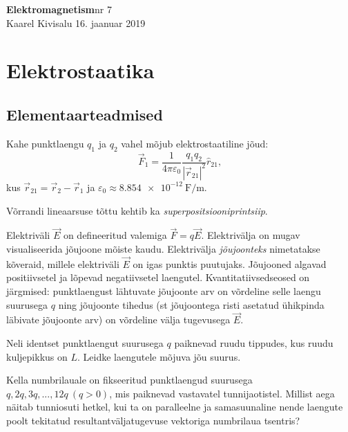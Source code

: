 \documentclass[a4paper,11pt,twocolumn]{article}
\begin{document}
{\huge \textbf{Elektromagnetism}\hfill \normalsize{nr 7}} \\
{Kaarel Kivisalu \hfill 16. jaanuar 2019}


\section{Elektrostaatika}
\subsection{Elementaarteadmised}
Kahe punktlaengu \( q_1 \) ja \( q_2 \) vahel mõjub elektrostaatiline jõud:
\begin{equation*}
    \vec{F}_{1} = \dfrac{1}{4\pi\varepsilon_0 }\dfrac{q_1 q_2}{|\vec{r}_{21}|^2}\hat{r}_{21} \tag{Coulomb'i seadus},
\end{equation*}
kus \( \vec{r}_{21}=\vec{r}_2-\vec{r}_1 \) ja \( \varepsilon_0\approx\SI{8.854e-12}{\F\per\m} \).

Võrrandi lineaarsuse tõttu kehtib ka \textit{superpositsiooniprintsiip}.

Elektriväli \( \vec{E} \) on defineeritud valemiga \( \vec{F}=q\vec{E} \). Elektrivälja on mugav visualiseerida jõujoone mõiste kaudu. Elektrivälja \textit{jõujoonteks} nimetatakse kõveraid, millele elektriväli \( \vec{E} \) on igas punktis puutujaks. Jõujooned algavad positiivsetel ja lõpevad negatiivsetel laengutel. Kvantitatiivsedseosed on järgmised: punktlaengust lähtuvate jõujoonte arv on võrdeline selle laengu suurusega \( q \) ning jõujoonte tihedus (st jõujoontega risti asetatud ühikpinda läbivate jõujoonte arv) on võrdeline välja tugevusega \( \vec{E} \).
\begin{question}
    Neli identset punktlaengut suurusega \( q \) paiknevad ruudu tippudes, kus ruudu kuljepikkus on \( L \). Leidke laengutele mõjuva jõu suurus.
\end{question}

\begin{question}
    Kella numbrilauale on fikseeritud punktlaengud suurusega \( q, 2q, 3q,..., 12q\ (q > 0) \), mis paiknevad vastavatel tunnijaotistel. Millist aega näitab tunniosuti hetkel, kui ta on paralleelne ja samasuunaline nende laengute poolt tekitatud resultantväljatugevuse vektoriga numbrilaua tsentris?
\end{question}
\end{document}
